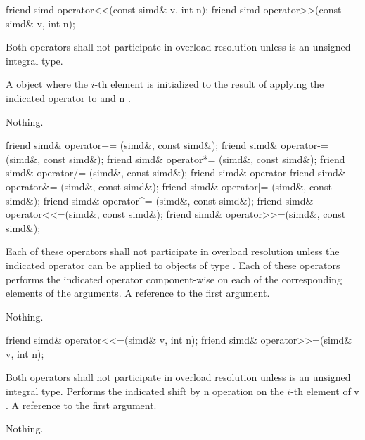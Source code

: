 \begin{itemdecl}
friend simd operator<<(const simd& v, int n);
friend simd operator>>(const simd& v, int n);
\end{itemdecl}
\begin{itemdescr}
  \pnum\remarks Both operators shall not participate in overload resolution unless  is an unsigned integral type.

  \pnum\returns A \simd object where the $i$-th element is initialized to the result of applying the indicated operator to  and \code n \foralli.

  \pnum\throws Nothing.
\end{itemdescr}

\begin{itemdecl}
friend simd& operator+= (simd&, const simd&);
friend simd& operator-= (simd&, const simd&);
friend simd& operator*= (simd&, const simd&);
friend simd& operator/= (simd&, const simd&);
friend simd& operator%
friend simd& operator&= (simd&, const simd&);
friend simd& operator|= (simd&, const simd&);
friend simd& operator^= (simd&, const simd&);
friend simd& operator<<=(simd&, const simd&);
friend simd& operator>>=(simd&, const simd&);
\end{itemdecl}
\begin{itemdescr}
  \pnum\remarks Each of these operators shall not participate in overload resolution unless the indicated operator can be applied to objects of type .
  \pnum\effects Each of these operators performs the indicated operator component-wise on each of the corresponding elements of the arguments.
  \pnum\returns A reference to the first argument.

  \pnum\throws Nothing.
\end{itemdescr}

\begin{itemdecl}
friend simd& operator<<=(simd& v, int n);
friend simd& operator>>=(simd& v, int n);
\end{itemdecl}
\begin{itemdescr}
  \pnum\remarks Both operators shall not participate in overload resolution unless  is an unsigned integral type.
  \pnum\effects Performs the indicated shift by \code n operation on the $i$-th element of \code v \foralli.
  \pnum\returns A reference to the first argument.

  \pnum\throws Nothing.
\end{itemdescr}

